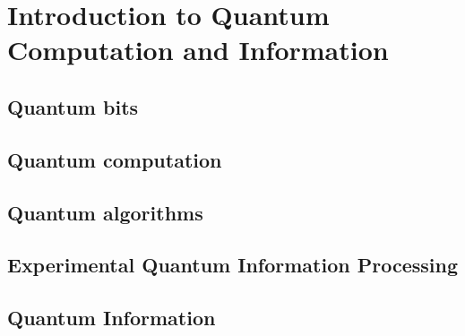 \documentclass{article}
\theoremstyle{definition}
\begin{document}
\section{Introduction to Quantum Computation and Information}
\newpage
\subsection{Quantum bits}
\newpage
\subsection{Quantum computation}
\newpage
\subsection{Quantum algorithms}
\newpage
\subsection{Experimental Quantum Information Processing}
\newpage
\subsection{Quantum Information}
\newpage

\newpage
\end{document}
